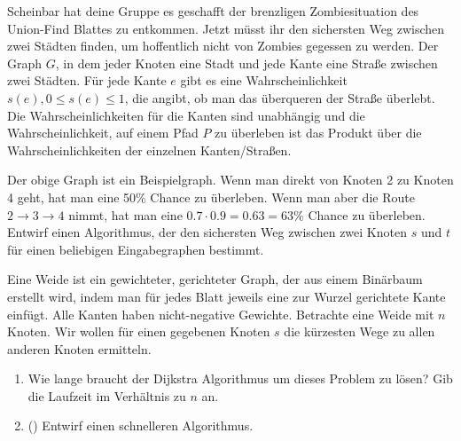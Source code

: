 \documentclass{uebung_cs}
\begin{document}
\begin{aufgabe}
	Scheinbar hat deine Gruppe es geschafft der brenzligen Zombiesituation des Union-Find Blattes zu entkommen.
	Jetzt müsst ihr den sichersten Weg zwischen zwei Städten finden, um hoffentlich nicht von Zombies gegessen zu werden.
	Der Graph $G$, in dem jeder Knoten eine Stadt und jede Kante eine Straße zwischen zwei Städten. Für jede Kante $e$ gibt es eine Wahrscheinlichkeit $s(e), 0 \leq s(e) \leq 1$, die angibt, ob man das überqueren der Straße überlebt.
	Die Wahrscheinlichkeiten für die Kanten sind unabhängig und die Wahrscheinlichkeit, auf einem Pfad $P$ zu überleben ist das Produkt über die Wahrscheinlichkeiten der einzelnen Kanten/Straßen.
	\begin{center}
	\end{center}
	Der obige Graph ist ein Beispielgraph.
	Wenn man direkt von Knoten 2 zu Knoten 4 geht, hat man eine 50\% Chance zu überleben.
	Wenn man aber die Route $2\rightarrow 3 \rightarrow 4$ nimmt, hat man eine $0.7\cdot 0.9 = 0.63 = 63\%$ Chance zu überleben.
	Entwirf einen Algorithmus, der den sichersten Weg zwischen zwei Knoten $s$ und $t$ für einen beliebigen Eingabegraphen bestimmt.
\end{aufgabe}


\begin{aufgabe}
	Eine Weide ist ein gewichteter, gerichteter Graph, der aus einem Binärbaum erstellt wird, indem man für jedes Blatt jeweils eine zur Wurzel gerichtete Kante einfügt.
	Alle Kanten haben nicht-negative Gewichte.
	Betrachte eine Weide mit $n$ Knoten.
	Wir wollen für einen gegebenen Knoten $s$ die kürzesten Wege zu allen anderen Knoten ermitteln.
	\begin{enumerate}
		\item Wie lange braucht der Dijkstra Algorithmus um dieses Problem zu lösen?
		Gib die Laufzeit im Verhältnis zu $n$ an.
		\item (\hard) Entwirf einen schnelleren Algorithmus. 
	\end{enumerate} 
\end{aufgabe}
\end{document}
